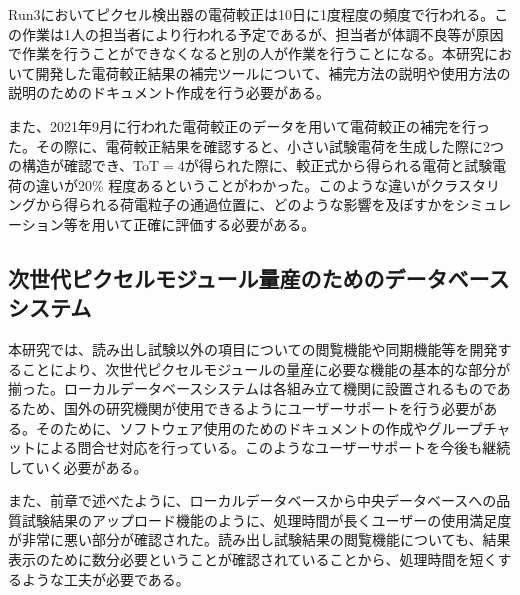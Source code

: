 Run3においてピクセル検出器の電荷較正は10日に1度程度の頻度で行われる。この作業は1人の担当者により行われる予定であるが、担当者が体調不良等が原因で作業を行うことができなくなると別の人が作業を行うことになる。本研究において開発した電荷較正結果の補完ツールについて、補完方法の説明や使用方法の説明のためのドキュメント作成を行う必要がある。

また、2021年9月に行われた電荷較正のデータを用いて電荷較正の補完を行った。その際に、電荷較正結果を確認すると、小さい試験電荷を生成した際に2つの構造が確認でき、ToT$=4$が得られた際に、較正式から得られる電荷と試験電荷の違いが20\% 程度あるということがわかった。このような違いがクラスタリングから得られる荷電粒子の通過位置に、どのような影響を及ぼすかをシミュレーション等を用いて正確に評価する必要がある。


\subsection{次世代ピクセルモジュール量産のためのデータベースシステム}
\label{sec:dbnokonngonokadai}

本研究では、読み出し試験以外の項目についての閲覧機能や同期機能等を開発することにより、次世代ピクセルモジュールの量産に必要な機能の基本的な部分が揃った。ローカルデータベースシステムは各組み立て機関に設置されるものであるため、国外の研究機関が使用できるようにユーザーサポートを行う必要がある。そのために、ソフトウェア使用のためのドキュメントの作成やグループチャットによる問合せ対応を行っている。このようなユーザーサポートを今後も継続していく必要がある。

また、前章で述べたように、ローカルデータベースから中央データベースへの品質試験結果のアップロード機能のように、処理時間が長くユーザーの使用満足度が非常に悪い部分が確認された。読み出し試験結果の閲覧機能についても、結果表示のために数分必要ということが確認されていることから、処理時間を短くするような工夫が必要である。

\newpage
